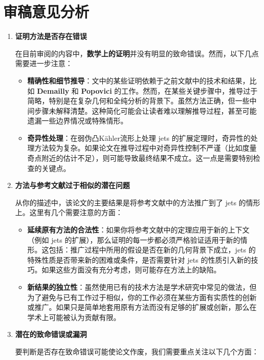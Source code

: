 \documentclass[lang=cn,zihao=-4,twoside,fontset=none]{textbook}
\begin{document}
\section{审稿意见分析}
\begin{enumerate}
    \item \textbf{证明方法是否存在错误}

    在目前审阅的内容中，\textbf{数学上的证明}并没有明显的致命错误。然而，以下几点需要进一步注意：

    \begin{itemize}
        \item \textbf{精确性和细节推导}：文中的某些证明依赖于之前文献中的技术和结果，比如 \textbf{Demailly} 和 \textbf{Popovici} 的工作。然而，在某些关键步骤中，推导过于简略，特别是在复杂几何和全纯分析的背景下。虽然方法正确，但一些中间步骤未解释清楚。这种简化可能会让读者难以理解推导过程，甚至可能遗漏一些边界情况或特殊情形。

        \item \textbf{奇异性处理}：在弱伪凸Kähler流形上处理 jets 的扩展定理时，奇异性的处理方法较为复杂。如果论文在推导过程中对奇异性控制不严谨（比如度量奇点附近的估计不足），则可能导致最终结果不成立。这一点是需要特别检查的关键点。
    \end{itemize}

    \item \textbf{方法与参考文献过于相似的潜在问题}

    从你的描述中，该论文的主要结果是将参考文献中的方法推广到了 jets 的情形上。这里有几个需要注意的方面：

    \begin{itemize}
        \item \textbf{延续原有方法的合法性}：如果你将参考文献中的定理应用于新的上下文（例如 jets 的扩展），那么证明的每一步都必须严格验证适用于新的情形。这包括：推广过程中所用的假设是否在新的几何背景下成立，jets 的特殊性质是否带来新的困难或条件，是否需要针对 jets 的性质引入新的技巧。如果这些方面没有充分考虑，则可能存在方法上的缺陷。

        \item \textbf{新结果的独立性}：虽然使用已有的技术方法是学术研究中常见的做法，但为了避免与已有工作过于相似，你的工作必须在某些方面有实质性的创新或推广。如果只是简单地套用原有方法而没有足够的扩展或创新，那么在学术上可能被认为贡献有限。
    \end{itemize}

    \item \textbf{潜在的致命错误或漏洞}

    要判断是否存在致命错误可能使论文作废，我们需要重点关注以下几个方面：


\end{enumerate}
\end{document}
